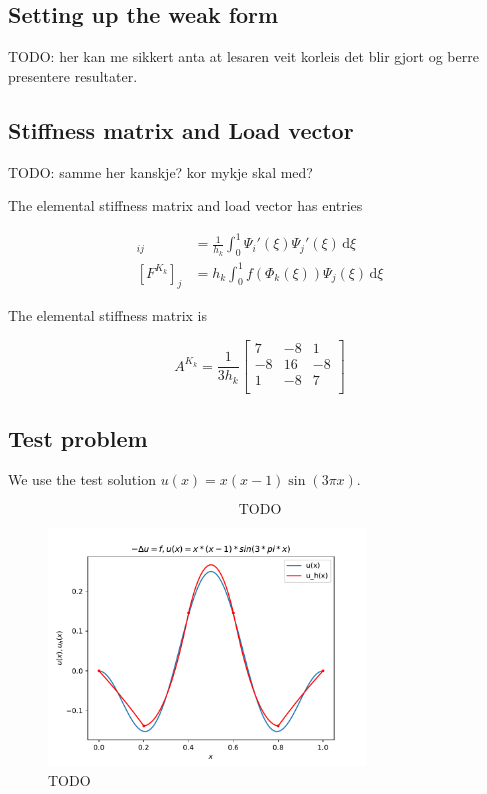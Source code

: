 \subsection{Setting up the weak form}

TODO: her kan me sikkert anta at lesaren veit korleis det blir gjort
og berre presentere resultater.

\subsection{Stiffness matrix and Load vector}

TODO: samme her kanskje? kor mykje skal med?

The elemental stiffness matrix and load vector has entries

\begin{align}
  [A^{K_k}]_{ij} &= \frac{1}{h_k} \int_{0}^{1} \Psi_i'(\xi)\Psi_j'(\xi) \,\mathrm{d}\xi \\
  [F^{K_k}]_j &= h_k \int_{0}^{1} f\left(\Phi_k\left(\xi\right)\right) \Psi_j\left(\xi\right) \,\mathrm{d}\xi
\end{align}

The elemental stiffness matrix is

\begin{equation}
  A^{K_k} = \frac{1}{3h_k}
  \begin{bmatrix}
  7 & -8 & 1\\
  -8 & 16 & -8\\
  1 & -8 & 7\\
  \end{bmatrix}
\end{equation}

\subsection{Test problem}

We use the test solution \( u(x) = x(x-1)\sin(3\pi x) \).

\begin{equation}
  \text{TODO}
\end{equation}

\begin{figure}[!h]
  \centering
  \includegraphics[width=0.75\textwidth]{Images/plots/task1_test_sol.pdf}
  \caption{TODO}
  \label{fig:test_eq}
\end{figure}

